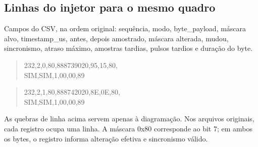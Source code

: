 \documentclass[12pt,a4paper]{article}
\begin{document}
\subsection{Linhas do injetor para o mesmo quadro}
Campos do CSV, na ordem original: sequência, modo, byte\_payload, máscara alvo, timestamp\_us, antes, depois amostrado, máscara alterada, mudou, sincronismo, atraso máximo, amostras tardias, pulsos tardios e duração do byte.

\begin{quote}\small\ttfamily\raggedright 232,2,0,80,888739020,95,15,80,\\
SIM,SIM,1,00,00,89\end{quote}
\begin{quote}\small\ttfamily\raggedright 232,2,1,80,888742020,8E,0E,80,\\
SIM,SIM,1,00,00,89\end{quote}
As quebras de linha acima servem apenas à diagramação. Nos arquivos originais, cada registro ocupa uma linha. A máscara 0x80 corresponde ao bit 7; em ambos os bytes, o registro informa alteração efetiva e sincronismo válido.
\end{document}
